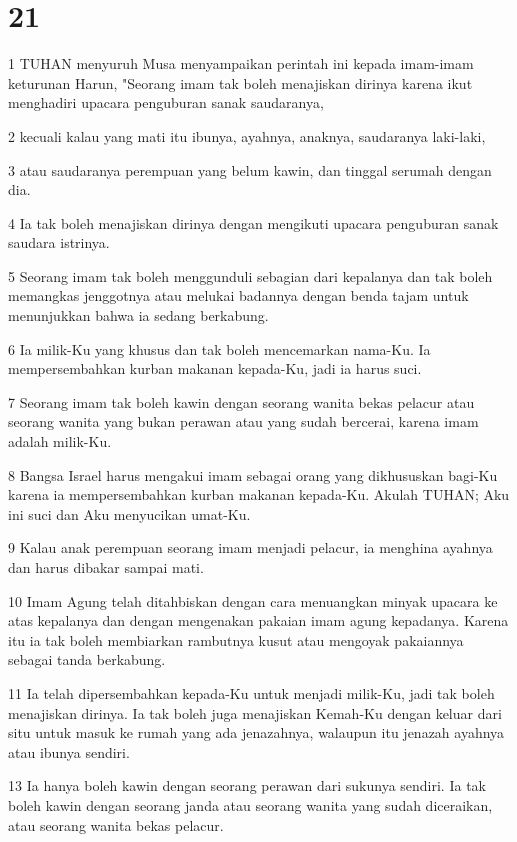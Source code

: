 \chapter{21}

\par 1 TUHAN menyuruh Musa menyampaikan perintah ini kepada imam-imam keturunan Harun, "Seorang imam tak boleh menajiskan dirinya karena ikut menghadiri upacara penguburan sanak saudaranya,
\par 2 kecuali kalau yang mati itu ibunya, ayahnya, anaknya, saudaranya laki-laki,
\par 3 atau saudaranya perempuan yang belum kawin, dan tinggal serumah dengan dia.
\par 4 Ia tak boleh menajiskan dirinya dengan mengikuti upacara penguburan sanak saudara istrinya.
\par 5 Seorang imam tak boleh menggunduli sebagian dari kepalanya dan tak boleh memangkas jenggotnya atau melukai badannya dengan benda tajam untuk menunjukkan bahwa ia sedang berkabung.
\par 6 Ia milik-Ku yang khusus dan tak boleh mencemarkan nama-Ku. Ia mempersembahkan kurban makanan kepada-Ku, jadi ia harus suci.
\par 7 Seorang imam tak boleh kawin dengan seorang wanita bekas pelacur atau seorang wanita yang bukan perawan atau yang sudah bercerai, karena imam adalah milik-Ku.
\par 8 Bangsa Israel harus mengakui imam sebagai orang yang dikhususkan bagi-Ku karena ia mempersembahkan kurban makanan kepada-Ku. Akulah TUHAN; Aku ini suci dan Aku menyucikan umat-Ku.
\par 9 Kalau anak perempuan seorang imam menjadi pelacur, ia menghina ayahnya dan harus dibakar sampai mati.
\par 10 Imam Agung telah ditahbiskan dengan cara menuangkan minyak upacara ke atas kepalanya dan dengan mengenakan pakaian imam agung kepadanya. Karena itu ia tak boleh membiarkan rambutnya kusut atau mengoyak pakaiannya sebagai tanda berkabung.
\par 11 Ia telah dipersembahkan kepada-Ku untuk menjadi milik-Ku, jadi tak boleh menajiskan dirinya. Ia tak boleh juga menajiskan Kemah-Ku dengan keluar dari situ untuk masuk ke rumah yang ada jenazahnya, walaupun itu jenazah ayahnya atau ibunya sendiri.
\par 13 Ia hanya boleh kawin dengan seorang perawan dari sukunya sendiri. Ia tak boleh kawin dengan seorang janda atau seorang wanita yang sudah diceraikan, atau seorang wanita bekas pelacur.
